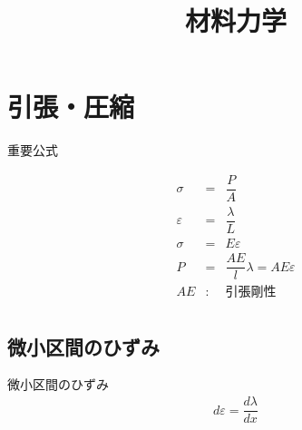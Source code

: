 \documentclass[a4paper]{jsarticle}
\author{}
\title{材料力学}
\date{}
\begin{document}
\maketitle
\tableofcontents
\newpage

\section{引張・圧縮}
\begin{itembox}[l]{重要公式}
    \begin{center}
        \begin{eqnarray*}
            \sigma&=&\dfrac{P}{A}\\
            \varepsilon&=&\dfrac{\lambda}{L}\\
            \sigma&=&E\varepsilon\\
            P&=&\dfrac{AE}{l}\lambda=AE\varepsilon\\
            AE&:&引張剛性\\
        \end{eqnarray*}
    \end{center}
\end{itembox}
\subsection{微小区間のひずみ}
\begin{itembox}[l]{微小区間のひずみ}
    \begin{eqnarray*}
        d\varepsilon=\dfrac{d\lambda}{dx}\\
    \end{eqnarray*}
\end{itembox}
\end{document}
